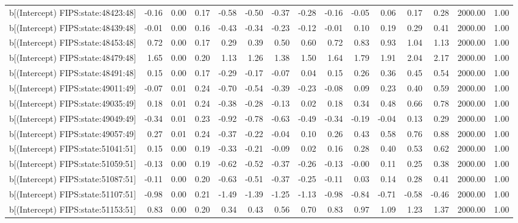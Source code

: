 \begin{table}[ht]
\begin{tabular}{rrrrrrrrrrrrrrr}
  b[(Intercept) FIPS:state:48423:48] & -0.16 & 0.00 & 0.17 & -0.58 & -0.50 & -0.37 & -0.28 & -0.16 & -0.05 & 0.06 & 0.17 & 0.28 & 2000.00 & 1.00 \\ 
  b[(Intercept) FIPS:state:48439:48] & -0.01 & 0.00 & 0.16 & -0.43 & -0.34 & -0.23 & -0.12 & -0.01 & 0.10 & 0.19 & 0.29 & 0.41 & 2000.00 & 1.00 \\ 
  b[(Intercept) FIPS:state:48453:48] & 0.72 & 0.00 & 0.17 & 0.29 & 0.39 & 0.50 & 0.60 & 0.72 & 0.83 & 0.93 & 1.04 & 1.13 & 2000.00 & 1.00 \\ 
  b[(Intercept) FIPS:state:48479:48] & 1.65 & 0.00 & 0.20 & 1.13 & 1.26 & 1.38 & 1.50 & 1.64 & 1.79 & 1.91 & 2.04 & 2.17 & 2000.00 & 1.00 \\ 
  b[(Intercept) FIPS:state:48491:48] & 0.15 & 0.00 & 0.17 & -0.29 & -0.17 & -0.07 & 0.04 & 0.15 & 0.26 & 0.36 & 0.45 & 0.54 & 2000.00 & 1.00 \\ 
  b[(Intercept) FIPS:state:49011:49] & -0.07 & 0.01 & 0.24 & -0.70 & -0.54 & -0.39 & -0.23 & -0.08 & 0.09 & 0.23 & 0.40 & 0.59 & 2000.00 & 1.00 \\ 
  b[(Intercept) FIPS:state:49035:49] & 0.18 & 0.01 & 0.24 & -0.38 & -0.28 & -0.13 & 0.02 & 0.18 & 0.34 & 0.48 & 0.66 & 0.78 & 2000.00 & 1.00 \\ 
  b[(Intercept) FIPS:state:49049:49] & -0.34 & 0.01 & 0.23 & -0.92 & -0.78 & -0.63 & -0.49 & -0.34 & -0.19 & -0.04 & 0.13 & 0.29 & 2000.00 & 1.00 \\ 
  b[(Intercept) FIPS:state:49057:49] & 0.27 & 0.01 & 0.24 & -0.37 & -0.22 & -0.04 & 0.10 & 0.26 & 0.43 & 0.58 & 0.76 & 0.88 & 2000.00 & 1.00 \\ 
  b[(Intercept) FIPS:state:51041:51] & 0.15 & 0.00 & 0.19 & -0.33 & -0.21 & -0.09 & 0.02 & 0.16 & 0.28 & 0.40 & 0.53 & 0.62 & 2000.00 & 1.00 \\ 
  b[(Intercept) FIPS:state:51059:51] & -0.13 & 0.00 & 0.19 & -0.62 & -0.52 & -0.37 & -0.26 & -0.13 & -0.00 & 0.11 & 0.25 & 0.38 & 2000.00 & 1.00 \\ 
  b[(Intercept) FIPS:state:51087:51] & -0.11 & 0.00 & 0.20 & -0.63 & -0.51 & -0.37 & -0.25 & -0.11 & 0.03 & 0.14 & 0.28 & 0.41 & 2000.00 & 1.00 \\ 
  b[(Intercept) FIPS:state:51107:51] & -0.98 & 0.00 & 0.21 & -1.49 & -1.39 & -1.25 & -1.13 & -0.98 & -0.84 & -0.71 & -0.58 & -0.46 & 2000.00 & 1.00 \\ 
  b[(Intercept) FIPS:state:51153:51] & 0.83 & 0.00 & 0.20 & 0.34 & 0.43 & 0.56 & 0.70 & 0.83 & 0.97 & 1.09 & 1.23 & 1.37 & 2000.00 & 1.00 \\ 

\end{tabular}
\end{table}
